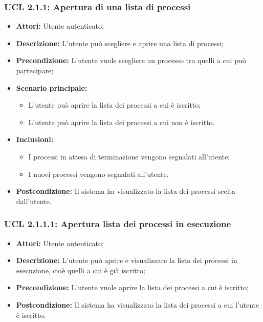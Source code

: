\subsubsection{UCL 2.1.1: Apertura di una lista di processi}
\begin{itemize}
\item \textbf{Attori:} Utente autenticato;
\item \textbf{Descrizione:} L'utente può scegliere e aprire una lista di processi;
\item \textbf{Precondizione:} L'utente vuole scegliere un processo tra quelli a cui può partecipare;
\item \textbf{Scenario principale:}
\begin{itemize}
\item L'utente può aprire la lista dei processi a cui è iscritto;
\item L'utente può aprire la lista dei processi a cui non è iscritto.
\end{itemize}
\item \textbf{Inclusioni:}
\begin{itemize}
\item I processi in attesa di terminazione vengono segnalati all'utente;
\item I nuovi processi vengono segnalati all'utente.
\end{itemize}
\item \textbf{Postcondizione:} Il sistema ha visualizzato la lista dei processi scelta dall'utente.
\end{itemize}

\hypertarget{L2.1.1.1}{}
\subsubsection{UCL 2.1.1.1: Apertura lista dei processi in esecuzione}
\begin{itemize}
\item \textbf{Attori:} Utente autenticato;
\item \textbf{Descrizione:} L'utente può aprire e visualizzare la lista dei processi in esecuzione, cioè quelli a cui è già iscritto;
\item \textbf{Precondizione:} L'utente vuole aprire la lista dei processi a cui è iscritto;
\item \textbf{Postcondizione:} Il sistema ha visualizzato la lista dei processi a cui l'utente è iscritto.
\end{itemize}

